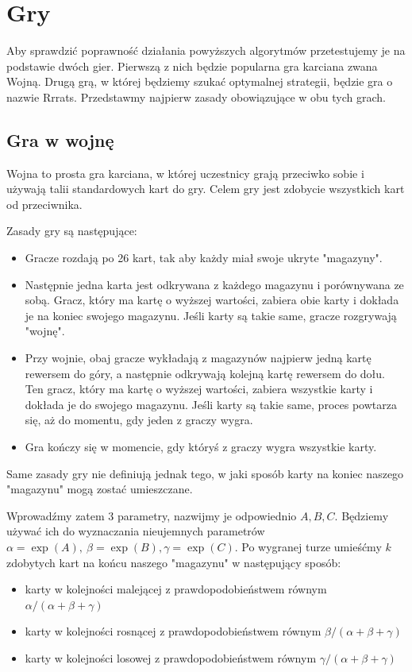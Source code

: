 \documentclass[inzynierska]{pwr_wmat_praca_dyplomowa}
\theoremstyle{plain}
\numberwithin{theorem}{chapter}
\theoremstyle{definition}
\numberwithin{theorem}{chapter}
\begin{document}
	\chapter{Gry}
	Aby sprawdzić poprawność działania powyższych algorytmów przetestujemy je na podstawie dwóch gier. Pierwszą z nich będzie popularna gra karciana zwana Wojną. Drugą grą, w której będziemy szukać optymalnej strategii, będzie gra o nazwie Rrrats. Przedstawmy najpierw zasady obowiązujące w obu tych grach.

	\section{Gra w wojnę}
	Wojna to prosta gra karciana, w której uczestnicy grają przeciwko sobie i używają talii standardowych kart do gry. Celem gry jest zdobycie wszystkich kart od przeciwnika.
	
	Zasady gry są następujące:
	\begin{itemize}
		\item 	Gracze rozdają po 26 kart, tak aby każdy miał swoje ukryte "magazyny".
		
		\item Następnie jedna karta jest odkrywana z każdego magazynu i porównywana ze sobą. Gracz, który ma kartę o wyższej wartości, zabiera obie karty i dokłada je na koniec swojego magazynu. Jeśli karty są takie same, gracze rozgrywają "wojnę".
		
		\item Przy wojnie, obaj gracze wykładają z magazynów najpierw jedną kartę rewersem do góry, a następnie odkrywają kolejną kartę rewersem do dołu. Ten gracz, który ma kartę o wyższej wartości, zabiera wszystkie karty i dokłada je do swojego magazynu. Jeśli karty są takie same, proces powtarza się, aż do momentu, gdy jeden z graczy wygra.
		
		\item Gra kończy się w momencie, gdy któryś z graczy wygra wszystkie karty.
	\end{itemize}
	Same zasady gry nie definiują jednak tego, w jaki sposób karty na koniec naszego "magazynu" mogą zostać umieszczane.
	
	Wprowadźmy zatem 3 parametry, nazwijmy je odpowiednio $A, B, C$. Będziemy używać ich do wyznaczania nieujemnych parametrów $\alpha = \exp(A), \
	\beta= \exp(B), \gamma= \exp(C)$. Po wygranej turze umieśćmy $k$ zdobytych kart na końcu naszego "magazynu" w następujący sposób:
	\begin{itemize}
		\item karty w kolejności malejącej z prawdopodobieństwem równym $\alpha/(\alpha+\beta+\gamma)$ 
		
		\item karty w kolejności rosnącej z prawdopodobieństwem równym $\beta/(\alpha+\beta+\gamma)$ 
		
		\item karty w kolejności losowej z prawdopodobieństwem równym $\gamma/(\alpha+\beta+\gamma)$ 
	\end{itemize}
	
\end{document}
